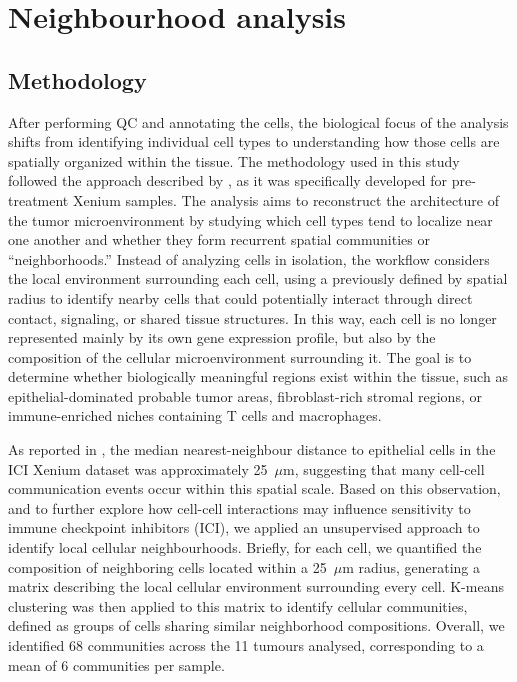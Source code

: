 \setchapterpreamble[u]{\margintoc}
\chapter{Neighbourhood analysis}

\section{Methodology}

After performing QC and annotating the cells, the biological focus of the analysis shifts from identifying individual cell types to understanding how those cells are spatially organized within the tissue. The methodology used in this study followed the approach described by \cite{Grande.et.al}, as it was specifically developed for pre-treatment Xenium samples. The analysis aims to reconstruct the architecture of the tumor microenvironment by studying which cell types tend to localize near one another and whether they form recurrent spatial communities or ``neighborhoods.'' Instead of analyzing cells in isolation, the workflow considers the local environment surrounding each cell, using a previously defined by \cite{Grande.et.al} spatial radius to identify nearby cells that could potentially interact through direct contact, signaling, or shared tissue structures. In this way, each cell is no longer represented mainly by its own gene expression profile, but also by the composition of the cellular microenvironment surrounding it. The goal is to determine whether biologically meaningful regions exist within the tissue, such as epithelial-dominated probable tumor areas, fibroblast-rich stromal regions, or immune-enriched niches containing T cells and macrophages.

As reported in \cite{Grande.et.al}, the median nearest-neighbour distance to epithelial cells in the ICI Xenium dataset was approximately 25~$\mu$m, suggesting that many cell-cell communication events occur within this spatial scale. Based on this observation, and to further explore how cell-cell interactions may influence sensitivity to immune checkpoint inhibitors (ICI), we applied an unsupervised approach to identify local cellular neighbourhoods. Briefly, for each cell, we quantified the composition of neighboring cells located within a 25~$\mu$m radius, generating a matrix describing the local cellular environment surrounding every cell. K-means clustering was then applied to this matrix to identify cellular communities, defined as groups of cells sharing similar neighborhood compositions. Overall, we identified 68 communities across the 11 tumours analysed, corresponding to a mean of 6 communities per sample.


